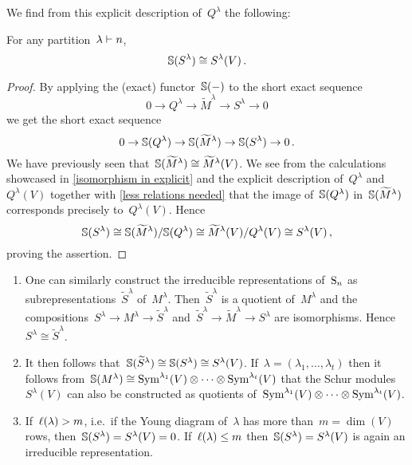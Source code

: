 \documentclass[a4paper,10pt]{scrartcl}
\begin{document}
We find from this explicit description of~$Q^\lambda$ the following:

\begin{theorem}
  For any partition~$\lambda \vdash n$,
  \[
    \mathbb{S}(S^\lambda) \cong S^{\lambda}(V) \,.
  \]
\end{theorem}

\begin{proof}
  By applying the (exact) functor~$\mathbb{S}(-)$ to the short exact sequence
  \[
    0
    \to
    Q^\lambda
    \to
    \widetilde{M}^\lambda
    \to
    S^\lambda
    \to
    0
  \]
  we get the short exact sequence
  \[
    0
    \to
    \mathbb{S}(Q^\lambda)
    \to
    \mathbb{S}(\widetilde{M}^\lambda)
    \to
    \mathbb{S}(S^\lambda)
    \to
    0 \,.
  \]
  We have previously seen that~$\mathbb{S}(\widetilde{M}^\lambda) \cong \widetilde{M}^\lambda(V)$.
  We see from the calculations showcased in \cref{isomorphism in explicit} and the explicit description of~$Q^\lambda$ and~$Q^{\lambda}(V)$ together with \cref{less relations needed} that the image of~$\mathbb{S}(Q^\lambda)$ in~$\mathbb{S}(\widetilde{M}^\lambda)$ corresponds precisely to~$Q^{\lambda}(V)$.
  Hence
  \[
    \mathbb{S}(S^\lambda)
    \cong
    \mathbb{S}(\widetilde{M}^\lambda)/\mathbb{S}(Q^\lambda)
    \cong
    \widetilde{M}^{\lambda}(V)/Q^{\lambda}(V)
    \cong
    S^{\lambda}(V) \,,
  \]
  proving the assertion.
\end{proof}


\begin{remark}
  \label{remark on schur functor}
  \leavevmode
  \begin{enumerate}
    \item
      One can similarly construct the irreducible representations of~$\operatorname{S}_n$ as subrepresentations~$\widetilde{S}^\lambda$ of~$M^\lambda$.
      Then~$\widetilde{S}^\lambda$ is a quotient of~$M^\lambda$ and the compositions~$S^\lambda \to M^\lambda \to \widetilde{S}^\lambda$ and~$\widetilde{S}^\lambda \to \widetilde{M}^\lambda \to S^\lambda$ are isomorphisms.
      Hence~$S^\lambda \cong \tilde{S}^\lambda$.
    \item
      It then follows that~$\mathbb{S}(\widetilde{S}^\lambda) \cong \mathbb{S}(S^\lambda) \cong S^{\lambda}(V)$.
      If~$\lambda = (\lambda_1, \dotsc, \lambda_t)$ then it follows from~$\mathbb{S}(M^\lambda) \cong \operatorname{Sym}^{\lambda_1}(V) \otimes \dotsb \otimes \operatorname{Sym}^{\lambda_t}(V)$ that the Schur modules~$S^{\lambda}(V)$ can also be constructed as quotients of~$\operatorname{Sym}^{\lambda_1}(V) \otimes \dotsb \otimes \operatorname{Sym}^{\lambda_t}(V)$.
    \item
      \label{kernel of schur functor}
      If~$\operatorname{\ell}(\lambda) > m$, i.e.\ if the Young diagram of~$\lambda$ has more than~$m = \dim(V)$ rows, then~$\mathbb{S}(S^\lambda) = S^\lambda(V) = 0$.
      If~$\operatorname{\ell}(\lambda) \leq m$ then~$\mathbb{S}(S^\lambda) = S^\lambda(V)$ is again an irreducible representation.
  \end{enumerate}
\end{remark}
\end{document}

